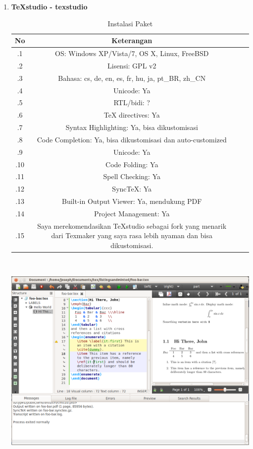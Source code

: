 \begin{enumerate}
\item \textbf{TeXstudio - texstudio}

\begin{table}[ht]
	\caption{Instalasi Paket}
	\centering
	\begin{tabular}{cccc}
		\hline
		No&Keterangan&\\
		\hline
		.1&OS: Windows XP/Vista/7, OS X, Linux, FreeBSD&\\
		.2&Lisensi: GPL v2&\\
		.3&Bahasa: cs, de, en, es, fr, hu, ja, pt\_BR, zh\_CN&\\
		.4&Unicode: Ya&\\
		.5&RTL/bidi: ?&\\
		.6&TeX directives: Ya&\\
		.7&Syntax Highlighting: Ya, bisa dikustomisasi&\\
		.8&Code Completion: Ya, bisa dikustomisasi dan auto-customized&\\
		.9&Unicode: Ya&\\
		.10&Code Folding: Ya&\\
		.11&Spell Checking: Ya&\\
		.12&SyncTeX: Ya&\\
		.13&Built-in Output Viewer: Ya, mendukung PDF&\\
		.14&Project Management: Ya&\\
		.15&Saya merekomendasikan TeXstudio sebagai fork yang menarik dari Texmaker yang saya rasa lebih nyaman dan bisa dikustomisasi.&\\
		\hline
	\end{tabular}
\end{table}
\includegraphics[width=15.23cm,height=10.79cm]{gambar/image7.jpg}


\end{enumerate}
